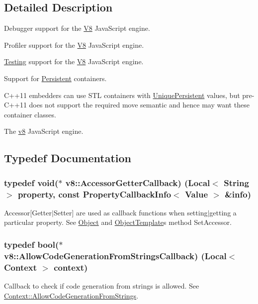 \subsection{Detailed Description}
Debugger support for the \hyperlink{classv8_1_1_v8}{V8} Java\+Script engine.

Profiler support for the \hyperlink{classv8_1_1_v8}{V8} Java\+Script engine.

\hyperlink{classv8_1_1_testing}{Testing} support for the \hyperlink{classv8_1_1_v8}{V8} Java\+Script engine.

Support for \hyperlink{classv8_1_1_persistent}{Persistent} containers.

C++11 embedders can use S\+T\+L containers with \hyperlink{classv8_1_1_unique_persistent}{Unique\+Persistent} values, but pre-\/\+C++11 does not support the required move semantic and hence may want these container classes.

The \hyperlink{namespacev8}{v8} Java\+Script engine. 

\subsection{Typedef Documentation}
\hypertarget{namespacev8_a722613c87061708a4f1aa050d095f868}{}
\subsubsection[{Accessor\+Getter\+Callback}]{\setlength{\rightskip}{0pt plus 5cm}typedef void($\ast$ v8\+::\+Accessor\+Getter\+Callback) ({\bf Local}$<$ {\bf String} $>$ property, const {\bf Property\+Callback\+Info}$<$ {\bf Value} $>$ \&info)}\label{namespacev8_a722613c87061708a4f1aa050d095f868}
Accessor\mbox{[}Getter$\vert$\+Setter\mbox{]} are used as callback functions when setting$\vert$getting a particular property. See \hyperlink{classv8_1_1_object}{Object} and \hyperlink{classv8_1_1_object_template}{Object\+Template}\textquotesingle{}s method Set\+Accessor. \hypertarget{namespacev8_a521d909ec201742a1cb35d50a8e2a3c2}{}
\subsubsection[{Allow\+Code\+Generation\+From\+Strings\+Callback}]{\setlength{\rightskip}{0pt plus 5cm}typedef bool($\ast$ v8\+::\+Allow\+Code\+Generation\+From\+Strings\+Callback) ({\bf Local}$<$ {\bf Context} $>$ context)}\label{namespacev8_a521d909ec201742a1cb35d50a8e2a3c2}
Callback to check if code generation from strings is allowed. See \hyperlink{classv8_1_1_context_a794ccc42113566f5d363f89c8b0d3c2c}{Context\+::\+Allow\+Code\+Generation\+From\+Strings}. \hypertarget{namespacev8_ab699f4bbbb56350e6e915682e420fcdc}{}
